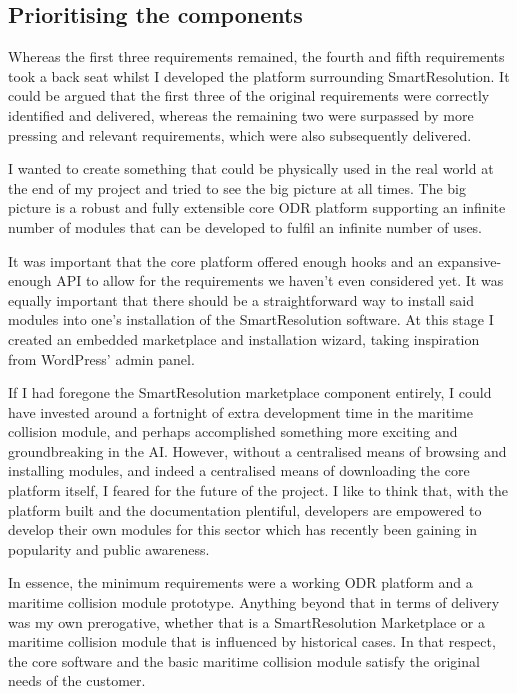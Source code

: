 \subsection{Prioritising the components}

Whereas the first three requirements remained, the fourth and fifth requirements took a back seat whilst I developed the platform surrounding SmartResolution. It could be argued that the first three of the original requirements were correctly identified and delivered, whereas the remaining two were surpassed by more pressing and relevant requirements, which were also subsequently delivered.

I wanted to create something that could be physically used in the real world at the end of my project and tried to see the big picture at all times. The big picture is a robust and fully extensible core ODR platform supporting an infinite number of modules that can be developed to fulfil an infinite number of uses.

It was important that the core platform offered enough hooks and an expansive-enough API to allow for the requirements we haven't even considered yet. It was equally important that there should be a straightforward way to install said modules into one's installation of the SmartResolution software. At this stage I created an embedded marketplace and installation wizard, taking inspiration from WordPress' admin panel.

If I had foregone the SmartResolution marketplace component entirely, I could have invested around a fortnight of extra development time in the maritime collision module, and perhaps accomplished something more exciting and groundbreaking in the AI. However, without a centralised means of browsing and installing modules, and indeed a centralised means of downloading the core platform itself, I feared for the future of the project. I like to think that, with the platform built and the documentation plentiful, developers are empowered to develop their own modules for this sector which has recently been gaining in popularity and public awareness.

In essence, the minimum requirements were a working ODR platform and a maritime collision module prototype. Anything beyond that in terms of delivery was my own prerogative, whether that is a SmartResolution Marketplace or a maritime collision module that is influenced by historical cases. In that respect, the core software and the basic maritime collision module satisfy the original needs of the customer.

